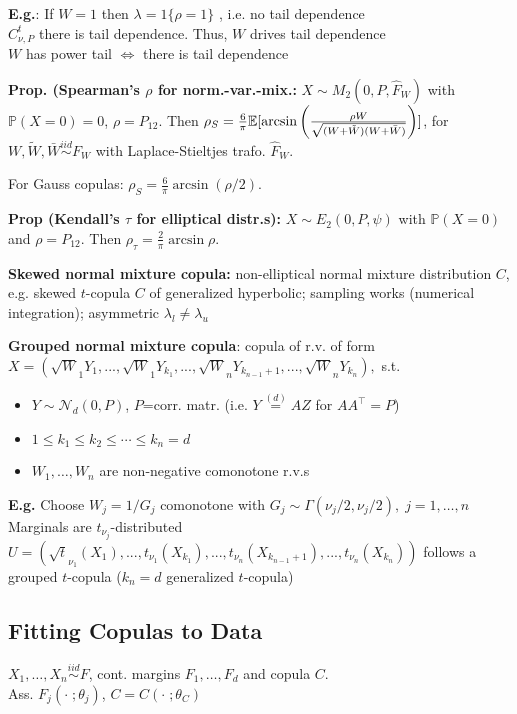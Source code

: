 \textbf{E.g.}: If $W=1$ then $\lambda=1\{\rho=1\}$ , i.e. no tail dependence\\
$C^t_{\nu,P}$ there is tail dependence. Thus, $W$ drives tail dependence\\
$W$ has power tail $\iff$ there is tail dependence

\textbf{Prop. (Spearman's $\rho$ for norm.-var.-mix.:}
$X\sim M_2(0,P,\hat F_W)$ with $\mathbb{P}(X=0)=0$, $\rho=P_{12}$. Then
$\rho_S=\frac{6}{\pi}\mathbb{E}[\arcsin\bigg(\frac{\rho W}{\sqrt{(W+\tilde W)(W+\bar W)}}\bigg)]$,
for $W,\tilde W, \bar W\stackrel{iid}{\sim}F_W$ with Laplace-Stieltjes trafo. $\hat F_W$. 

For Gauss copulas: $\rho_S=\frac{6}{\pi}\arcsin(\rho/2)$.

\textbf{Prop (Kendall's $\tau$ for elliptical distr.s):}
$X\sim E_2(0,P,\psi)$ with $\mathbb{P}(X=0)$ and $\rho=P_{12}$. Then $\rho_\tau=\frac{2}{\pi}\arcsin\rho$.

\textbf{Skewed normal mixture copula:} non-elliptical normal mixture distribution $C$, e.g. skewed $t$-copula $C$ of generalized hyperbolic;
sampling works (numerical integration); asymmetric $\lambda_l\neq\lambda_u$


\textbf{Grouped normal mixture copula}: copula of r.v. of form 
$X = (\sqrt W_1 Y_1, . . . , \sqrt W_1 Y_{k_1} , . . . , \sqrt W_n Y_{k_{n-1}+1}, . . . , \sqrt W_n Y_{k_n} ),$ s.t. 
\begin{itemize}
    \item $Y\sim \mathcal{N}_d(0,P)$, $P$=corr. matr. (i.e. $Y\stackrel{(d)}{=}AZ$ for $AA^\top=P$)
    \item $1\leq k_1\leq k_2\leq \cdots\leq k_n=d$
    \item $W_1,\dots,W_n$ are non-negative comonotone r.v.s
\end{itemize}

\textbf{E.g.} Choose $W_j=1/G_j$ comonotone with $G_j\sim\Gamma(\nu_j/2,\nu_j/2),\; j=1,\dots,n$\\
Marginals are $t_{\nu_j}$-distributed\\
$U=(\sqrt t_{\nu_1}(X_1), . . . , t_{\nu_1}(X_{k_1}), . . . , t_{\nu_n}(X_{k_{n-1}+1}), . . . , t_{\nu_n}(X_{k_n}) )$ follows
a grouped $t$-copula ($k_n=d$ generalized $t$-copula)

\subsection*{Fitting Copulas to Data}

$X_1,\dots,X_n\stackrel{iid}{\sim}F$, cont. margins $F_1,\dots,F_d$ and copula $C$.\\
Ass. $F_j(\cdot\; ; \theta_j)$, $C=C(\cdot\; ; \theta_C)$

